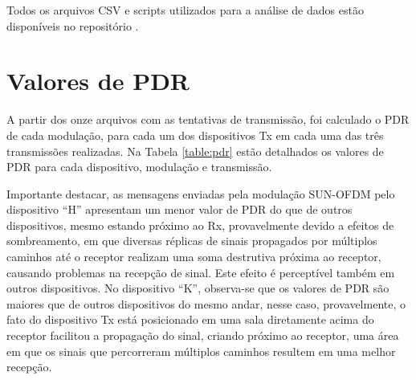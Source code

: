 Todos os arquivos CSV e scripts utilizados para a análise de dados estão disponíveis no repositório \cite{wisun-traces}.

\section{Valores de PDR}
A partir dos onze arquivos com as tentativas de transmissão, foi calculado o PDR de cada modulação, para cada um dos dispositivos Tx em cada uma das três transmissões realizadas. Na Tabela \ref{table:pdr} estão detalhados os valores de PDR para cada dispositivo, modulação e transmissão. 

Importante destacar, as mensagens enviadas pela modulação SUN-OFDM pelo dispositivo ``H'' apresentam um menor valor de PDR do que de outros dispositivos, mesmo estando próximo ao Rx, provavelmente devido a efeitos de sombreamento, em que diversas réplicas de sinais propagados por múltiplos caminhos até o receptor realizam uma soma destrutiva próxima ao receptor, causando problemas na recepção de sinal. Este efeito é perceptível também em outros dispositivos. No dispositivo ``K'', observa-se que os valores de PDR são maiores que de outros dispositivos do mesmo andar, nesse caso, provavelmente, o fato do dispositivo Tx está posicionado em uma sala diretamente acima do receptor facilitou a propagação do sinal, criando próximo ao receptor, uma área em que os sinais que percorreram múltiplos caminhos resultem em uma melhor recepção.

